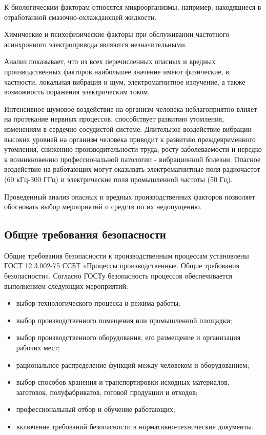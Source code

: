         К биологическим факторам относятся микроорганизмы, например,
        находящиеся в отработанной смазочно-охлаждающей жидкости. 

        Химические и психофизические факторы при обслуживании частотного
        асинхронного электропривода являются незначительными.

        Анализ показывает, что из всех перечисленных опасных и вредных
        производственных факторов наибольшее значение имеют физические, в
        частности, локальная вибрация и шум, электромагнитное излучение, а
        также возможность поражения электрическим током.

        Интенсивное шумовое воздействие на организм человека неблагоприятно
        влияет на протекание нервных процессов, способствует развитию
        утомления, изменениям в сердечно-сосудистой системе. Длительное
        воздействие вибрации высоких уровней на организм человека приводит к
        развитию преждевременного утомления, снижению производительности труда,
        росту заболеваемости и нередко к возникновению профессиональной
        патологии - вибрационной болезни.  Опасное воздействие на работающих
        могут оказывать электромагнитные поля радиочастот (60 кГц-300 ГГц) и
        электрические поля промышленной частоты (50 Гц). 

        
        Проведенный анализ опасных и вредных производственных факторов
        позволяет обосновать выбор мероприятий и средств по их недопущению.

    \subsection{Общие требования безопасности}

        Общие требования безопасности к производственным процессам установлены
        ГОСТ 12.3.002-75 ССБТ «Процессы производственные. Общие требования
        безопасности». Согласно ГОСТу безопасность процессов обеспечивается
        выполнением следующих мероприятий:

        \begin{itemize}
            \item выбор технологического процесса и режима работы;
            \item выбор производственного помещения или промышленной площадки;
            \item выбор производственного оборудования, его размещение и
                организация рабочих мест;
            \item рациональное распределение функций между человеком и
                оборудованием;
            \item выбор способов хранения и транспортировки исходных
                материалов, заготовок, полуфабрикатов, готовой продукции и
                отходов; 
            \item профессиональный отбор и обучение работающих; 
            \item включение требований безопасности в нормативно-технические
                документы.
        \end{itemize}

